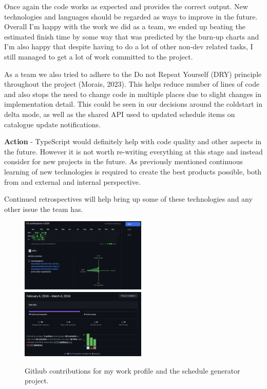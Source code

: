   Once again the code works as expected and provides the correct output. New technologies and languages should be regarded as ways to improve in the future.
  Overall I'm happy with the work we did as a team, we ended up beating the estimated finish time by some way that was predicted by the burn-up charts and 
  I'm also happy that despite having to do a lot of other non-dev related tasks, I still managed to get a lot of work committed to the project.

  As a team we also tried to adhere to the Do not Repeat Yourself (DRY) principle throughout the project (Morais, 2023). This helps reduce number of lines of 
  code and  also stops the need to change code in multiple places due to slight changes in implementation detail. This could be seen in our decisions around the 
  coldstart in delta mode, as well as the shared API used to updated schedule items on catalogue update notifications.

  \vspace{0.2cm}
  \textbf{Action} - TypeScript would definitely help with code quality and other aspects in the future. However it is not worth re-writing everything at this
  stage and instead consider for new projects in the future. As previously mentioned continuous learning of new technologies is required to create the 
  best products possible, both from and external and internal perspective. 
  
  Continued retrospectives will help bring up some of these technologies and any other issue the team has.

  \begin{figure}[H]
    \centering
    \includegraphics[width=6cm]{assets/outputs/githubContributions.png}
    \includegraphics[width=6cm]{assets/outputs/scheduleGeneratorChanges.png}

    \caption{Github contributions for my work profile and the schedule generator project.}
    \label{fig:githubStats}
  \end{figure}
  
\newpage
